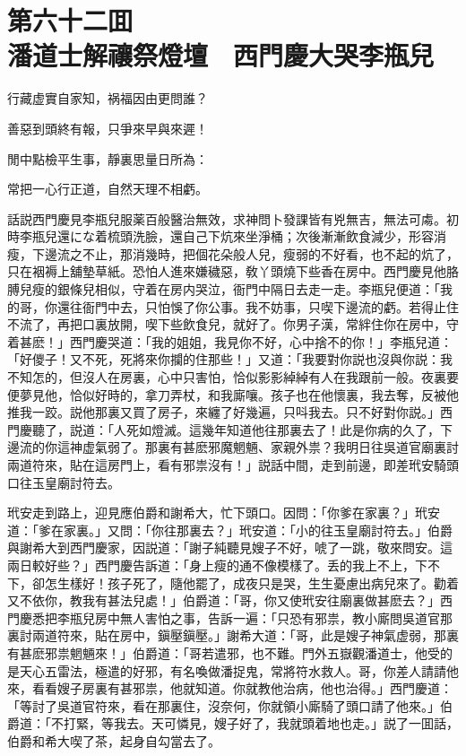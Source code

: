 
\chapter*{第六十二囬　\\潘道士解禳祭燈壇　西門慶大哭李瓶兒}


\begin{myquote}
行藏虚實自家知，祸福因由更問誰？

善惡到頭終有報，只爭來早與來遲！

閒中點檢平生事，靜裏思量日所為：

常把一心行正道，自然天理不相虧。
\end{myquote}

話説西門慶見李瓶兒服薬百般醫治無效，求神問卜發課皆有兇無吉，無法可䖏。初時李瓶兒還にな着梳頭洗臉，還自己下炕來坐淨桶；次後漸漸飲食減少，形容消瘦，下邊流之不止，那消幾時，把個花朵般人兒，瘦弱的不好看，也不起的炕了，只在裀褥上舖墊草紙。恐怕人進來嫌穢惡，敎丫頭燒下些香在房中。西門慶見他胳膊兒瘦的銀條兒相似，守着在房内哭泣，衙門中隔日去走一走。李瓶兒便道：「我的哥，你還往衙門中去，只怕悞了你公事。我不妨事，只喫下邊流的虧。若得止住不流了，再把口裏放開，喫下些飲食兒，就好了。你男子漢，常絆住你在房中，守着甚麽！」西門慶哭道：「我的姐姐，我見你不好，心中捨不的你！」李瓶兒道：「好儍子！又不死，死將來你攔的住那些！」又道：「我要對你説也沒與你説：我不知怎的，但沒人在房裏，心中只害怕，恰似影影綽綽有人在我跟前一般。夜裏要便夢見他，恰似好時的，拿刀弄杖，和我廝嚷。孩子也在他懷裏，我去奪，反被他推我一跤。説他那裏又買了房子，來纏了好幾遍，只呌我去。只不好對你説。」西門慶聽了，説道：「人死如燈滅。這幾年知道他往那裏去了！此是你病的久了，下邊流的你這神虚氣弱了。那裏有甚麽邪魔魍魎、家親外祟？我明日往吳道官廟裏討兩道符來，貼在這房門上，看有邪祟沒有！」説話中間，走到前邊，即差玳安騎頭口往玉皇廟討符去。

玳安走到路上，迎見應伯爵和謝希大，忙下頭口。因問：「你爹在家裏？」玳安道：「爹在家裏。」又問：「你往那裏去？」玳安道：「小的往玉皇廟討符去。」伯爵與謝希大到西門慶家，因説道：「謝子純聽見嫂子不好，唬了一跳，敬來問安。這兩日較好些？」西門慶告訴道：「身上瘦的通不像模樣了。丢的我上不上，下不下，卻怎生樣好！孩子死了，隨他罷了，成夜只是哭，生生憂慮出病兒來了。勸着又不依你，教我有甚法兒處！」伯爵道：「哥，你又使玳安往廟裏做甚麽去？」西門慶悉把李瓶兒房中無人害怕之事，告訴一遍：「只恐有邪祟，教小廝問吳道官那裏討兩道符來，貼在房中，鎭壓鎭壓。」謝希大道：「哥，此是嫂子神氣虚弱，那裏有甚麽邪祟魍魎來！」伯爵道：「哥若遣邪，也不難。門外五嶽觀潘道士，他受的是天心五雷法，極遣的好邪，有名喚做潘捉鬼，常將符水救人。哥，你差人請請他來，看看嫂子房裏有甚邪祟，他就知道。你就教他治病，他也治得。」西門慶道：「等討了吳道官符來，看在那裏住，沒奈何，你就領小廝騎了頭口請了他來。」伯爵道：「不打緊，等我去。天可憐見，嫂子好了，我就頭着地也走。」説了一囬話，伯爵和希大喫了茶，起身自勾當去了。

